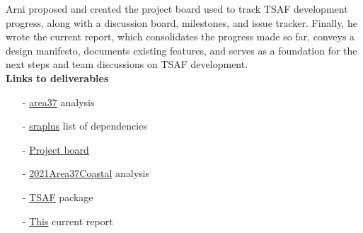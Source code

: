 \documentclass[12pt]{article}
\newcommand\blue[1]{\textcolor{darkblue}{#1}}
\begin{document}
Arni proposed and created the project board used to track TSAF development
progress, along with a discussion board, milestones, and issue tracker. Finally,
he wrote the current report, which consolidates the progress made so far,
conveys a design manifesto, documents existing features, and serves as a
foundation for the next steps and team discussions on TSAF development.\\[-2ex]

\textbf{Links to deliverables}

\begin{itemize}
  \item[-]\blue{\href{https://github.com/sofia-tsaf/area37}{{\sf area37}}}
  analysis\\[-3ex]
  \item[-]\blue{
    \href{https://github.com/sofia-tsaf/doc/blob/main/sraplus_dependencies.md}
    {{\sf sraplus}}} list of dependencies\\[-3ex]
  \item[-]\blue{\href{https://github.com/sofia-tsaf/project/projects/1}
    {\sf Project board}}
  \item[-]\blue{\href{https://github.com/sofia-tsaf/2021Area37Coastal}
    {{\sf 2021Area37Coastal}}} analysis\\[-3ex]
  \item[-]\blue{\href{https://github.com/sofia-tsaf/TSAF}{{\sf TSAF}}}
  package\\[-3ex]
  \item[-]\blue{\href{https://arni-magnusson.github.io/pdf/2021-tsaf.pdf}
    {{\sf This}}} current report
\end{itemize}
\end{document}
